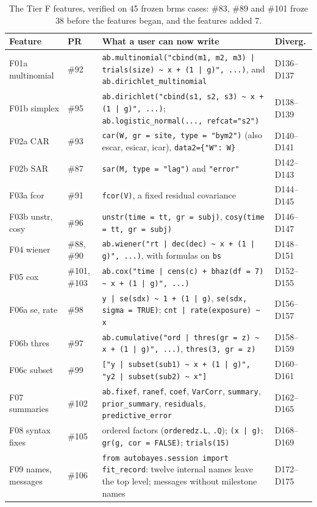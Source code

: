 \documentclass[11pt]{article}
\newcommand{\code}[1]{\texttt{#1}}
\begin{document}
\begin{table}[tbp]
\small
\begin{center}\begin{tabular}{@{}>{\raggedright\arraybackslash}p{}>{\raggedright\arraybackslash}p{}>{\raggedright\arraybackslash}p{}>{\raggedright\arraybackslash}p{}@{}}
\toprule
Feature & PR & What a user can now write & Diverg. \\
\midrule
F01a multinomial & \#92 & \code{ab.multinomial("cbind(m1, m2, m3) | trials(size) \textasciitilde{} x + (1 | g)", ...)}, and \code{ab.dirichlet\_multinomial} & D136--D137 \\
F01b simplex & \#95 & \code{ab.dirichlet("cbind(s1, s2, s3) \textasciitilde{} x + (1 | g)", ...)}; \code{ab.logistic\_normal(..., refcat="s2")} & D138--D139 \\
F02a CAR & \#93 & \code{car(W, gr = site, type = "bym2")} (also escar, esicar, icar), \code{data2=\{"W": W\}} & D140--D141 \\
F02b SAR & \#87 & \code{sar(M, type = "lag")} and \code{"error"} & D142--D143 \\
F03a fcor & \#91 & \code{fcor(V)}, a fixed residual covariance & D144--D145 \\
F03b unstr, cosy & \#96 & \code{unstr(time = tt, gr = subj)}, \code{cosy(time = tt, gr = subj)} & D146--D147 \\
F04 wiener & \#88, \#90 & \code{ab.wiener("rt | dec(dec) \textasciitilde{} x + (1 | g)", ...)}, with formulas on \code{bs} & D148--D151 \\
F05 cox & \#101, \#103 & \code{ab.cox("time | cens(c) + bhaz(df = 7) \textasciitilde{} x + (1 | g)", ...)} & D152--D155 \\
F06a se, rate & \#98 & \code{y | se(sdx) \textasciitilde{} 1 + (1 | g)}, \code{se(sdx, sigma = TRUE)}; \code{cnt | rate(exposure) \textasciitilde{} x} & D156--D157 \\
F06b thres & \#97 & \code{ab.cumulative("ord | thres(gr = z) \textasciitilde{} x + (1 | g)", ...)}, \code{thres(3, gr = z)} & D158--D159 \\
F06c subset & \#99 & \code{["y | subset(sub1) \textasciitilde{} x + (1 | g)", "y2 | subset(sub2) \textasciitilde{} x"]} & D160--D161 \\
F07 summaries & \#102 & \code{ab.fixef}, \code{ranef}, \code{coef}, \code{VarCorr}, \code{summary}, \code{prior\_summary}, \code{residuals}, \code{predictive\_error} & D162--D165 \\
F08 syntax fixes & \#105 & ordered factors (\code{orderedz.L}, \code{.Q}); \code{(x | g)}; \code{gr(g, cor = FALSE)}; \code{trials(15)} & D168--D169 \\
F09 names, messages & \#106 & \code{from autobayes.session import fit\_record}: twelve internal names leave the top level; messages without milestone names & D172--D175 \\
\bottomrule
\end{tabular}\end{center}
\caption{\small The Tier F features, verified on 45 frozen brms cases: \#83, \#89 and \#101 froze 38 before the features
began, and the features added 7.}\label{tab:built}
\end{table}
\end{document}
